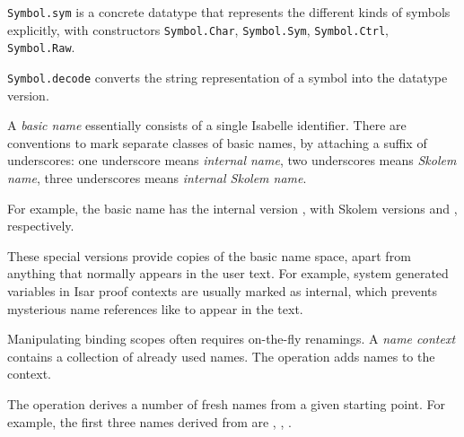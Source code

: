 \begin{isabellebody}
\begin{isamarkuptext}
\begin{description}
  \item \verb|Symbol.sym| is a concrete datatype that represents
  the different kinds of symbols explicitly, with constructors \verb|Symbol.Char|, \verb|Symbol.Sym|, \verb|Symbol.Ctrl|, \verb|Symbol.Raw|.

  \item \verb|Symbol.decode| converts the string representation of a
  symbol into the datatype version.

  \end{description}%
\end{isamarkuptext}%
\isamarkuptrue%
%
\endisatagmlref
{\isafoldmlref}%
%
\isadelimmlref
%
\endisadelimmlref
%
\isamarkuptrue%
%
\begin{isamarkuptext}%
A \emph{basic name} essentially consists of a single Isabelle
  identifier.  There are conventions to mark separate classes of basic
  names, by attaching a suffix of underscores: one underscore means
  \emph{internal name}, two underscores means \emph{Skolem name},
  three underscores means \emph{internal Skolem name}.

  For example, the basic name  has the internal version
  , with Skolem versions  and , respectively.

  These special versions provide copies of the basic name space, apart
  from anything that normally appears in the user text.  For example,
  system generated variables in Isar proof contexts are usually marked
  as internal, which prevents mysterious name references like  to appear in the text.

  \medskip Manipulating binding scopes often requires on-the-fly
  renamings.  A \emph{name context} contains a collection of already
  used names.  The  operation adds names to the
  context.

  The  operation derives a number of fresh names from
  a given starting point.  For example, the first three names derived
  from  are , , .


\end{isamarkuptext}
\end{isabellebody}

